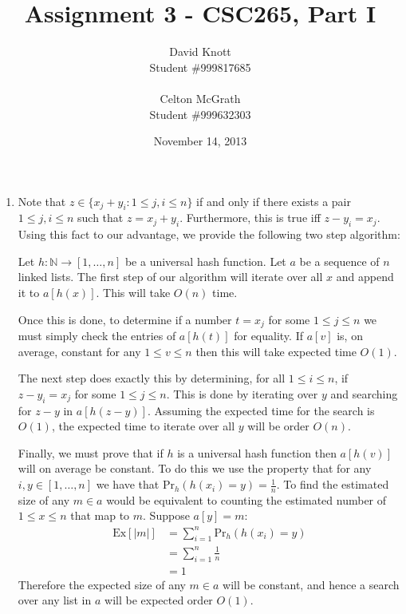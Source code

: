 \documentclass[letterpaper,10pt]{article}
\begin{document}
\title{Assignment 3 - CSC265, Part I}
\author{David Knott \\ Student \#999817685 \\ \vspace{-1mm} \\  Celton McGrath \\ Student \#999632303}
\date{November 14, 2013}
\maketitle
\begin{enumerate}
  \item Note that $z \in \{x_j + y_i : 1 \leq j, i \leq n \}$ if and only if there exists a pair $1 \leq j, i \leq n $ such that $z = x_j + y_i$. Furthermore, this is true iff $z - y_i = x_j$. Using this fact to our advantage, we provide the following two step algorithm:

  Let $h : \mathbb{N} \to [1,\dots, n] $ be a universal hash function. Let $a$ be a sequence of $n$ linked lists. The first step of our algorithm will iterate over all $x$ and append it to $a[h(x)]$. This will take $O(n)$ time.

  Once this is done, to determine if a number $t = x_j$ for some $1 \leq j \leq n$ we must simply check the entries of $a[h(t)]$ for equality. If $a[v]$ is, on average, constant for any $1 \leq v \leq n $ then this will take expected time $O(1)$.

  The next step does exactly this by determining, for all $1 \leq i \leq n$, if $z - y_i = x_j$ for some $1 \leq j \leq n$. This is done by iterating over $y$ and searching for $z - y$ in $a[h(z-y)]$. Assuming the expected time for the search is $O(1)$, the expected time to iterate over all $y$ will be order $O(n)$.

  Finally, we must prove that if $h$ is a universal hash function then $a[h(v)]$ will on average be constant. To do this we use the property that for any $i, y \in [1,\dots, n]$ we have that $\mathrm{Pr}_h(h(x_{i}) = y) = \frac{1}{n} $. To find the estimated size of any $m \in a$ would be equivalent to counting the estimated number of $1 \leq x \leq n$ that map to $m$. Suppose $a[y] = m$:
  \begin{align*}
    \mathrm{Ex} [|m|] & = \sum_{i=1}^n \mathrm{Pr}_h(h(x_{i}) = y) \\
    & = \sum_{i=1}^n \frac{1}{n} \\
    & = 1
  \end{align*}
  Therefore the expected size of any $m \in a$ will be constant, and hence a search over any list in $a$ will be expected order $O(1)$. 


\end{enumerate}
\end{document}
